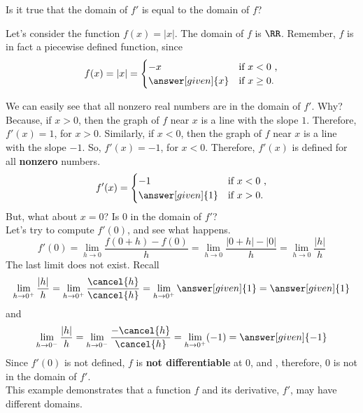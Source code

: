 \documentclass{ximera}
\begin{document}
\begin{question}
  Is it true that the domain of $f'$ is equal to the domain of $f$?
  \begin{prompt}
  \begin{multipleChoice}
  \end{multipleChoice}
  \begin{feedback}
   Let's consider the function $f(x)=|x|$. The domain of $f$ is  $\RR$.
   Remember, $f$ is in fact a piecewise defined function, since
    \[
f(x)=|x| =
\begin{cases}
 -x &\text{if $x<0$ ,}\\
 \answer[given]{ x} &\text{if $x\geq 0$}.
\end{cases}
\]

   We can easily see that all nonzero real numbers are in the domain of $f'$. Why?\\
   Because, if $x>0$, then the graph of $f$ near $x$ is a line with the slope $1$. Therefore,  $f'(x)=1$, for $x>0$.
   Similarly, if $x<0$, then the graph of $f$ near $x$ is a line with the slope $-1$. So, $f'(x)=-1$,  for $x<0$.
  Therefore, $f'(x)$ is defined for all \textbf{nonzero} numbers.
   \[
f'(x) =
\begin{cases}
 -1&\text{if $x<0$ ,}\\
  \answer[given]{1} &\text{if $x> 0$}.
\end{cases}
\]
But, what about $x=0$? Is 0 in the domain of $f'$?\\
Let's try to compute $f'(0)$, and see what happens.
\[
		f'(0)=  \lim_{h\to 0} \dfrac{f(0+h) - f(0)}{h}= \lim_{h\to 0} \dfrac{|0+h|-|0| }{h}
		= \lim_{h\to 0} \dfrac{|h| }{h}
		\]
		The last limit does not exist. Recall
		\[
				 \lim_{h\to 0^+} \dfrac{|h| }{h}= \lim_{h\to 0^+} \dfrac{\cancel{h} }{\cancel{h}}=\lim_{h\to 0^+} \answer[given]{1}=\answer[given]{1}
		\]
		and
		\[
				 \lim_{h\to 0^-} \dfrac{|h| }{h}= \lim_{h\to 0^-} \dfrac{-\cancel{h} }{\cancel{h}}=\lim_{h\to 0^+} (-1)=\answer[given]{-1}
		\]
	Since $f'(0)$ is not defined, $f$ is \textbf{not differentiable} at $0$, and , therefore,  $0$ is not in the domain of $f'$.\\
	This example demonstrates that a function $f$ and its derivative, $f'$, may have different domains.
  \end{feedback}
  \end{prompt}
\end{question}
\end{document}

